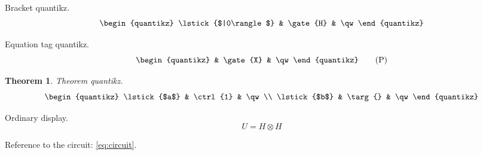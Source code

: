 \documentclass{article}
\newtheorem{theorem}{Theorem}
\begin{document}
Bracket quantikz.
\[ \begin{quantikz} \lstick{$|0\rangle$} & \gate{H} & \qw \end{quantikz} \]

Equation tag quantikz.
\begin{equation}
\begin{quantikz} & \gate{X} & \qw \end{quantikz} \tag{P}
\end{equation}

\begin{theorem}
Theorem quantikz.
\begin{equation}
\begin{quantikz} \lstick{$a$} & \ctrl{1} & \qw \\ \lstick{$b$} & \targ{} & \qw \end{quantikz}
\label{eq:circuit}
\end{equation}
\end{theorem}

Ordinary display.
\[ U = H \otimes H \]

Reference to the circuit: \eqref{eq:circuit}.
\end{document}
